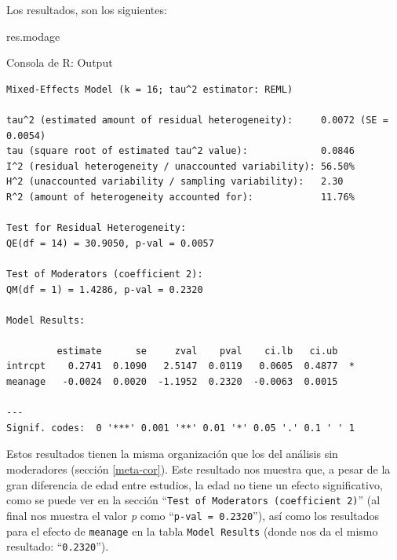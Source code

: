 \documentclass[
  bookmarksnumbered]{article}
\newenvironment{Shaded}{\begin{snugshade}}{\end{snugshade}}
\newcommand{\NormalTok}[1]{\textcolor[rgb]{0.12,0.11,0.11}{#1}}
\begin{document}
Los resultados, son los siguientes:

\begin{Shaded}
\begin{Highlighting}[]
\NormalTok{res.modage}
\end{Highlighting}
\end{Shaded}

\begin{ROut}{Consola de R: Output~\thetcbcounter}
                \begin{footnotesize}
                \begin{verbatim} 
Mixed-Effects Model (k = 16; tau^2 estimator: REML)

tau^2 (estimated amount of residual heterogeneity):     0.0072 (SE = 0.0054)
tau (square root of estimated tau^2 value):             0.0846
I^2 (residual heterogeneity / unaccounted variability): 56.50%
H^2 (unaccounted variability / sampling variability):   2.30
R^2 (amount of heterogeneity accounted for):            11.76%

Test for Residual Heterogeneity:
QE(df = 14) = 30.9050, p-val = 0.0057

Test of Moderators (coefficient 2):
QM(df = 1) = 1.4286, p-val = 0.2320

Model Results:

         estimate      se     zval    pval    ci.lb   ci.ub    
intrcpt    0.2741  0.1090   2.5147  0.0119   0.0605  0.4877  * 
meanage   -0.0024  0.0020  -1.1952  0.2320  -0.0063  0.0015    

---
Signif. codes:  0 '***' 0.001 '**' 0.01 '*' 0.05 '.' 0.1 ' ' 1
 \end{verbatim}
                \end{footnotesize}
                \end{ROut}

Estos resultados tienen la misma organización que los del análisis sin moderadores (sección \ref{meta-cor}). Este resultado nos muestra que, a pesar de la gran diferencia de edad entre estudios, la edad no tiene un efecto significativo, como se puede ver en la sección ``\texttt{Test\ of\ Moderators\ (coefficient\ 2)}'' (al final nos muestra el valor \emph{p} como ``\texttt{p-val =  0.2320}''), así como los resultados para el efecto de \texttt{meanage} en la tabla \texttt{Model\ Results} (donde nos da el mismo resultado: ``\texttt{0.2320}'').
\end{document}
